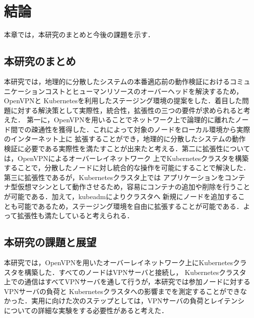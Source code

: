 \chapter{結論}
\label{conclusion}

本章では，本研究のまとめと今後の課題を示す．

\section{本研究のまとめ}
\label{conclusion:conclusion}

本研究では，地理的に分散したシステムの本番適応前の動作検証におけるコミュニケーションコストとヒューマンリソースのオーバーヘッドを解決するため，OpenVPNと
Kubernetesを利用したステージング環境の提案をした．着目した問題に対する解決策として実際性，統合性，拡張性の三つの要件が求められると考えた．
第一に，OpenVPNを用いることでネットワーク上で論理的に離れたノード間での疎通性を獲得した．これによって対象のノードをローカル環境から実際のインターネット上に
拡張することができ，地理的に分散したシステムの動作検証に必要である実際性を満たすことが出来たと考える．第二に拡張性については，OpenVPNによるオーバーレイネットワーク
上でKubernetesクラスタを構築することで，分散したノードに対し統合的な操作を可能にすることで解決した．第三に拡張性であるが，Kubernetesクラスタ上では
アプリケーションをコンテナ型仮想マシンとして動作させるため，容易にコンテナの追加や削除を行うことが可能である．加えて，kubeadmによりクラスタへ
新規にノードを追加することも可能であるため，ステージング環境を自由に拡張することが可能である．よって拡張性も満たしていると考えられる．

\section{本研究の課題と展望}
\label{conclusion:issue}

本研究では，OpenVPNを用いたオーバーレイネットワーク上にKubernetesクラスタを構築した．すべてのノードはVPNサーバと接続し，
Kubernetesクラスタ上での通信はすべてVPNサーバを通して行うが，本研究では参加ノードに対するVPNサーバの負荷と
Kubernetesクラスタへの影響までを測定することができなかった．実用に向けた次のステップとしては，VPNサーバの負荷とレイテンシ
についての詳細な実験をする必要性があると考えた．

